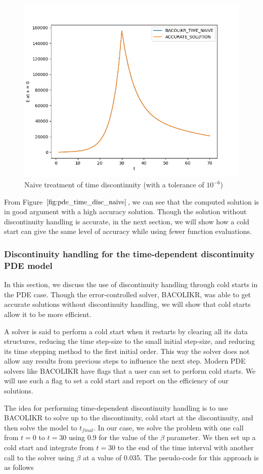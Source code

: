 \documentclass{article}
\begin{document}
\begin{figure}[H]
\centering
\includegraphics[width=0.7\linewidth]{./figures/pde_time_disc_naive}
\caption{Naive treatment of time discontinuity (with a tolerance of $10^{-6}$)}
\label{fig:pde_time_disc_naive}
\end{figure}

From Figure $\ref{fig:pde_time_disc_naive}$, we can see that the computed solution is in good argument with a high accuracy solution. Though the solution without discontinuity handling is accurate, in the next section, we will show how a cold start can give the same level of accuracy while using fewer function evaluations.

\subsubsection{Discontinuity handling for the time-dependent discontinuity PDE model}
\label{subsubsection:pde_time_disc_hand}
In this section, we discuss the use of discontinuity handling through cold starts in the PDE case. Though the error-controlled solver, BACOLIKR, was able to get accurate solutions without discontinuity handling, we will show that cold starts allow it to be more efficient.

A solver is said to perform a cold start when it restarts by clearing all its data structures, reducing the time step-size to the small initial step-size, and reducing its time stepping method to the first initial order. This way the solver does not allow any results from previous steps to influence the next step. Modern PDE solvers like BACOLIKR have flags that a user can set to perform cold starts. We will use such a flag to set a cold start and report on the efficiency of our solutions.

The idea for performing time-dependent discontinuity handling is to use BACOLIKR to solve up to the discontinuity, cold start at the discontinuity, and then solve the model to $t_{final}$. In our case, we solve the problem with one call from $t=0$ to $t=30$ using 0.9 for the value of the $\beta$ parameter. We then set up a cold start and integrate from $t=30$ to the end of the time interval with another call to the solver using $\beta$ at a value of 0.035. The pseudo-code for this approach is as follows
\end{document}
